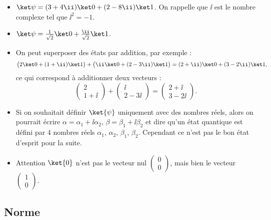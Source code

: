 \documentclass[11pt,class=report,crop=false]{standalone}
\begin{document}
\begin{exemple}
\sauteligne
\begin{itemize}
  \item $\ket\psi = (3+4\ii)\ket0 + (2-8\ii)\ket1$. On rappelle que $\ii$ est le nombre complexe tel que $\ii^2=-1$.
  \item $\ket\psi = \frac{1}{\sqrt2} \ket0 + \frac{\ii}{\sqrt2}\ket1$.
  \item On peut superposer des états par addition, par exemple :
  $$\big( 2\ket0+(1+\ii)\ket1\big) + \big( \ii\ket0+(2-3\ii)\ket1\big)
  = (2+\ii)\ket0+(3-2\ii)\ket1,$$
  ce qui correspond à additionner deux vecteurs :
  $$\begin{pmatrix}2\\1+\ii\end{pmatrix}+ \begin{pmatrix}\ii\\2-3\ii\end{pmatrix}
  =\begin{pmatrix}2+\ii\\3-2\ii\end{pmatrix}.$$
\end{itemize}
\end{exemple}

\begin{remarque*}
\sauteligne
\begin{itemize}
  \item Si on souhaitait définir $\ket{\psi}$ uniquement avec des nombres réels, alors on pourrait écrire $\alpha = \alpha_1+\ii \alpha_2$, $\beta = \beta_1+\ii \beta_2$ et dire qu'un état quantique est défini par $4$ nombres réels $\alpha_1$, $\alpha_2$, $\beta_1$, $\beta_2$. Cependant ce n'est pas le bon état d'esprit pour la suite.
  
  \item Attention $\ket{0}$ n'est pas le vecteur nul $\left(\begin{smallmatrix}0\\0\end{smallmatrix}\right)$, mais bien le vecteur 
  $\left(\begin{smallmatrix}1\\0\end{smallmatrix}\right)$.
  
\end{itemize}
\end{remarque*}


\subsection{Norme}
\end{document}
